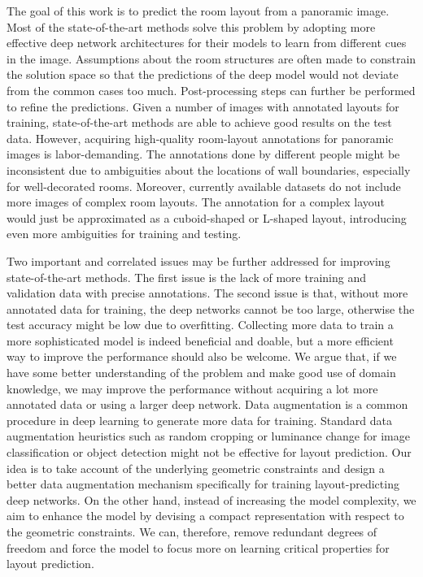 \documentclass[10pt,twocolumn,letterpaper]{article}
\begin{document}
The goal of this work is to predict the room layout from a panoramic image. Most of the state-of-the-art methods solve this problem by adopting more effective deep network architectures for their models to learn from different cues in the image. Assumptions about the room structures are often made to constrain the solution space so that the predictions of the deep model would not deviate from the common cases too much. Post-processing steps can further be performed to refine the predictions. Given a number of images with annotated layouts for training, state-of-the-art methods are able to achieve good results on the test data. However, acquiring high-quality room-layout annotations for panoramic images is labor-demanding. The annotations done by different people might be inconsistent due to ambiguities about the locations of wall boundaries, especially for well-decorated rooms. 
Moreover, currently available datasets do not include more images of complex room layouts. The annotation for a complex layout would just be approximated as a cuboid-shaped or L-shaped layout, introducing even more ambiguities for training and testing. 

Two important and correlated issues may be further addressed for improving state-of-the-art methods. The first issue is the lack of more training and validation data with precise annotations. The second issue is that, without more annotated data for training, the deep networks cannot be too large, otherwise the test accuracy might be low due to overfitting.
Collecting more data to train a more sophisticated model is indeed beneficial and doable, but a more efficient way to improve the performance should also be welcome. We argue that, if we have some better understanding of the problem and make good use of domain knowledge, we may improve the performance without acquiring a lot more annotated data or using a larger deep network. Data augmentation is a common procedure in deep learning to generate more data for training. Standard data augmentation heuristics such as random cropping or luminance change for image classification or object detection might not be effective for layout prediction. Our idea is to take account of the underlying geometric constraints and design a better data augmentation mechanism specifically for training layout-predicting deep networks. On the other hand, instead of increasing the model complexity, we aim to enhance the model by devising a compact representation with respect to the geometric constraints. We can, therefore, remove redundant degrees of freedom and force the model to focus more on learning critical properties for layout prediction. 
\end{document}
